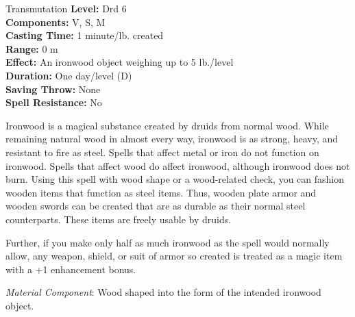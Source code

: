 {Transmutation}
{
	\textbf{Level:}
	Drd 6\\
	\textbf{Components:}
	V, S, M\\
	\textbf{Casting Time:}
	1 minute/lb. created\\
	\textbf{Range:}
	0 m\\
	\textbf{Effect:}
	An ironwood object weighing up to 5 lb./level\\
	\textbf{Duration:}
	One day/level (D)\\
	\textbf{Saving Throw:}
	None\\
	\textbf{Spell Resistance:}
	No\\
}
{
	Ironwood is a magical substance created by druids from normal wood. While remaining natural wood in almost every way, ironwood is as strong, heavy, and resistant to fire as steel. Spells that affect metal or iron do not function on ironwood. Spells that affect wood do affect ironwood, although ironwood does not burn. Using this spell with wood shape or a wood-related  check, you can fashion wooden items that function as steel items. Thus, wooden plate armor and wooden swords can be created that are as durable as their normal steel counterparts. These items are freely usable by druids.

	Further, if you make only half as much ironwood as the spell would normally allow, any weapon, shield, or suit of armor so created is treated as a magic item with a +1 enhancement bonus.

	\textit{Material Component}:
	Wood shaped into the form of the intended ironwood object.

}
